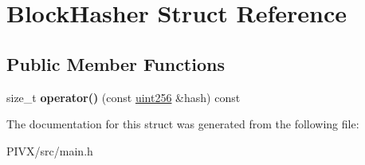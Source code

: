 \hypertarget{struct_block_hasher}{}\section{Block\+Hasher Struct Reference}
\label{struct_block_hasher}
\subsection*{Public Member Functions}
\begin{DoxyCompactItemize}
\item 
\mbox{\label{struct_block_hasher_a10db0b419e8c9d86e848655a13b83490}} 
size\+\_\+t {\bfseries operator()} (const \mbox{\hyperlink{classuint256}{uint256}} \&hash) const
\end{DoxyCompactItemize}


The documentation for this struct was generated from the following file\+:\begin{DoxyCompactItemize}
\item 
P\+I\+V\+X/src/main.\+h\end{DoxyCompactItemize}
